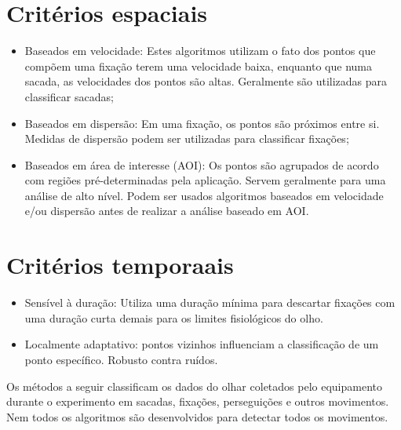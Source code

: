 \documentclass[brazil,]{report}
\newcommand{\sectionbreak}{\clearpage}
\begin{document}
\section{Critérios espaciais}\label{crituxe9rios-espaciais}

\begin{itemize}
\itemsep1pt\parskip0pt
\item
  Baseados em velocidade: Estes algoritmos utilizam o fato dos pontos
  que compõem uma fixação terem uma velocidade baixa, enquanto que numa
  sacada, as velocidades dos pontos são altas. Geralmente são utilizadas
  para classificar sacadas;
\item
  Baseados em dispersão: Em uma fixação, os pontos são próximos entre
  si. Medidas de dispersão podem ser utilizadas para classificar
  fixações;
\item
  Baseados em área de interesse (AOI): Os pontos são agrupados de acordo
  com regiões pré-determinadas pela aplicação. Servem geralmente para
  uma análise de alto nível. Podem ser usados algoritmos baseados em
  velocidade e/ou dispersão antes de realizar a análise baseado em AOI.
\end{itemize}

\section{Critérios temporaais}\label{crituxe9rios-temporaais}

\begin{itemize}
\itemsep1pt\parskip0pt
\item
  Sensível à duração: Utiliza uma duração mínima para descartar fixações
  com uma duração curta demais para os limites fisiológicos do olho.
\item
  Localmente adaptativo: pontos vizinhos influenciam a classificação de
  um ponto específico. Robusto contra ruídos.
\end{itemize}

\renewcommand{\sectionbreak}{\clearpage}


Os métodos a seguir classificam os dados do olhar coletados pelo
equipamento durante o experimento em sacadas, fixações, perseguições e
outros movimentos. Nem todos os algoritmos são desenvolvidos para
detectar todos os movimentos.
\end{document}

